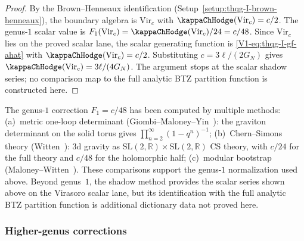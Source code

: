 \begin{proof}
By the Brown--Henneaux identification
(Setup~\ref{setup:thqg-I-brown-henneaux}), the boundary algebra is
$\mathrm{Vir}_c$ with $\kappaChHodge(\mathrm{Vir}_c) = c/2$. The genus-$1$ scalar value is
$F_1(\mathrm{Vir}_c) = \kappaChHodge(\mathrm{Vir}_c)/24 = c/48$. Since $\mathrm{Vir}_c$ lies on the proved
scalar lane, the scalar generating function is
\eqref{V1-eq:thqg-I-gf-ahat} with $\kappaChHodge(\mathrm{Vir}_c) = c/2$. Substituting
$c = 3\ell/(2G_N)$ gives $\kappaChHodge(\mathrm{Vir}_c) = 3\ell/(4G_N)$. The argument stops at the
scalar shadow series; no comparison map to the full analytic BTZ
partition function is constructed here.
\end{proof}

\begin{remark}
The genus-$1$ correction $F_1 = c/48$ has been computed by multiple
methods: (a)~metric one-loop determinant
(Giombi--Maloney--Yin~\cite{GMY08}):
the graviton determinant on the solid torus gives
$\prod_{n=2}^{\infty} (1 - q^n)^{-1}$; (b)~Chern--Simons theory
(Witten~\cite{Witten88}): 3d gravity as
$\mathrm{SL}(2,\mathbb{R}) \times \mathrm{SL}(2,\mathbb{R})$ CS theory,
with $c/24$ for the full theory and $c/48$ for the holomorphic half;
(c)~modular bootstrap (Maloney--Witten~\cite{MW10}). These comparisons
support the genus-$1$ normalization used above. Beyond genus~$1$, the
shadow method provides the scalar series shown above on the Virasoro
scalar lane, but its identification with the full analytic BTZ
partition function is additional dictionary data not proved here.
\end{remark}

\subsubsection{Higher-genus corrections}


